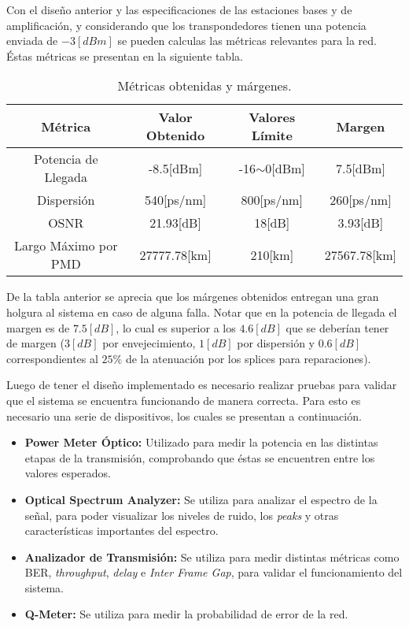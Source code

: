 \documentclass[letterpaper,11pt]{article} %
\begin{document}
\newp
Con el diseño anterior y las especificaciones de las estaciones bases y de amplificación, y considerando que los transpondedores tienen una potencia enviada de $-3[dBm]$ se pueden calculas las métricas relevantes para la red. Éstas métricas se presentan en la siguiente tabla.

\begin{table}[H]
\begin{tabular}{|c|c|c|c|}
\hline
\textbf{Métrica}     & \textbf{Valor Obtenido} & \textbf{Valores Límite} & \textbf{Margen}  \\ \hline
Potencia de Llegada  & -8.5{[}dBm{]}           & -16$\sim$0{[}dBm{]}     & 7.5{[}dBm{]}     \\ \hline
Dispersión           & 540{[}ps/nm{]}          & 800{[}ps/nm{]}          & 260{[}ps/nm{]}   \\ \hline
OSNR                 & 21.93{[}dB{]}           & 18{[}dB{]}              & 3.93{[}dB{]}    \\ \hline
Largo Máximo por PMD & 27777.78{[}km{]}        & 210{[}km{]}             & 27567.78{[}km{]} \\ \hline
\end{tabular}
\caption{Métricas obtenidas y márgenes.}
\end{table}

\newp
De la tabla anterior se aprecia que los márgenes obtenidos entregan una gran holgura al sistema en caso de alguna falla. Notar que en la potencia de llegada el margen es de $7.5[dB]$, lo cual es superior a los $4.6[dB]$ que se deberían tener de margen ($3[dB]$ por envejecimiento, $1[dB]$ por dispersión y $0.6[dB]$ correspondientes al $25\%$ de la atenuación por los splices para reparaciones).

\newp
Luego de tener el diseño implementado es necesario realizar pruebas para validar que el sistema se encuentra funcionando de manera correcta. Para esto es necesario una serie de dispositivos, los cuales se presentan a continuación.

\begin{itemize}
    \item \textbf{Power Meter Óptico: }Utilizado para medir la potencia en las distintas etapas de la transmisión, comprobando que éstas se encuentren entre los valores esperados.
    \item \textbf{Optical Spectrum Analyzer: }Se utiliza para analizar el espectro de la señal, para poder visualizar los niveles de ruido, los \textit{peaks} y otras características importantes del espectro.
    \item \textbf{Analizador de Transmisión: }Se utiliza para medir distintas métricas como BER, \textit{throughput}, \textit{delay} e \textit{Inter Frame Gap}, para validar el funcionamiento del sistema.
    \item \textbf{Q-Meter: }Se utiliza para medir la probabilidad de error de la red.
\end{itemize}
\end{document}
